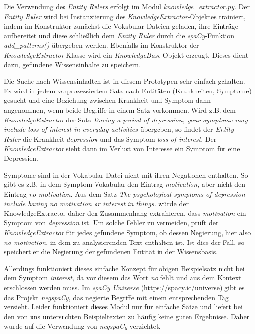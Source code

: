 Die Verwendung des \emph{Entity Rulers} erfolgt im Modul \emph{knowledge\_extractor.py}. Der \emph{Entity Ruler} wird bei Instanziierung des \emph{KnowledgeExtractor}-Objektes trainiert, indem im Konstruktor zunächst die Vokabular-Dateien geladen, ihre Einträge aufbereitet und diese schließlich dem \emph{Entity Ruler} durch die \emph{spaCy}-Funktion \emph{add\_patterns()} übergeben werden. Ebenfalls im Konstruktor der \emph{KnowledgeExtractor}-Klasse wird ein \emph{KnowledgeBase}-Objekt erzeugt. Dieses dient dazu, gefundene Wissensinhalte zu speichern.

Die Suche nach Wissensinhalten ist in diesem Prototypen sehr einfach gehalten. Es wird in jedem vorprozessiertem Satz nach Entitäten (Krankheiten, Symptome) gesucht und eine Beziehung zwischen Krankheit und Symptom dann angenommen, wenn beide Begriffe in einem Satz vorkommen. Wird z.B. dem \emph{KnowledgeExtractor} der Satz \emph{\glqq During a period of depression, your symptoms may include loss of interest in everyday activities\flqq} übergeben, so findet der \emph{Entity Ruler} die Krankheit \emph{depression} und das Symptom \emph{loss of interest}. Der \emph{KnowledgeExtractor} sieht dann im Verlust von Interesse ein Symptom für eine Depression.

Symptome sind in der Vokabular-Datei nicht mit ihren Negationen enthalten. So gibt es z.B. in dem Symptom-Vokabular den Eintrag \emph{motivation}, aber nicht den Eintrag \emph{no motivation}. Aus dem Satz \emph{\glqq The psychological symptoms of depression include having no motivation or interest in things.\flqq} würde der KnowledgeExtractor daher den Zusammenhang extrahieren, dass \emph{motivation} ein Symptom von \emph{depression} ist. Um solche Fehler zu vermeiden, prüft der \emph{KnowledgeExtractor} für jedes gefundene Symptom, ob dessen Negierung, hier also \emph{no motivation}, in dem zu analysierenden Text enthalten ist. Ist dies der Fall, so speichert er die Negierung der gefundenen Entität in der Wissensbasis.

Allerdings funktioniert dieses einfache Konzept für obigen Beispielsatz nicht bei dem Symptom \emph{interest}, da vor diesem das Wort \emph{no} fehlt und aus dem Kontext erschlossen werden muss. Im \emph{spaCy Universe} (https://spacy.io/universe) gibt es das Projekt \emph{negspaCy}, das negierte Begriffe mit einem entsprechenden Tag versieht. Leider funktioniert dieses Modul nur für einfache Sätze und liefert bei den von uns untersuchten Beispieltexten zu häufig keine guten Ergebnisse. Daher wurde auf die Verwendung von \emph{negspaCy} verzichtet.

